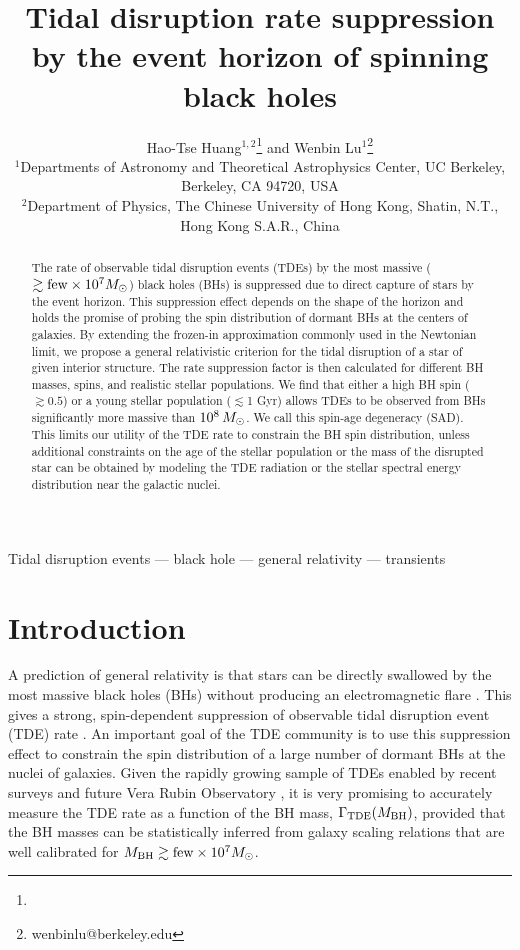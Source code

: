 \documentclass[useAMS,usenatbib]{mn2e}
\title[TDEs by spinning BHs]{Tidal disruption rate suppression by the event horizon of spinning black holes}
\author[Huang \& Lu]
  {Hao-Tse Huang$^{1,2}$\thanks{\myemail} and Wenbin Lu$^{1}$\thanks{wenbinlu@berkeley.edu}\\
    $^1$Departments of Astronomy and Theoretical Astrophysics Center, UC Berkeley, Berkeley, CA 94720, USA\\
    $^2$Department of Physics, The Chinese University of Hong Kong, Shatin, N.T., Hong Kong S.A.R., China\\
    }
\def\mr{\mathrm}
\def\msun{M_{\rm \odot}}
\def\mBH{M_{\rm BH}}
\begin{document}
\label{firstpage}
\maketitle

\begin{abstract}
The rate of observable tidal disruption events (TDEs) by the most massive ($\gtrsim\mr{few}\times 10^7\msun$) black holes (BHs) is suppressed due to direct capture of stars by the event horizon. This suppression effect depends on the shape of the horizon and holds the promise of probing the spin distribution of dormant BHs at the centers of galaxies. By extending the frozen-in approximation commonly used in the Newtonian limit, we propose a general relativistic criterion for the tidal disruption of a star of given interior structure. The rate suppression factor is then calculated for different BH masses, spins, and realistic stellar populations. We find that either a high BH spin ($\gtrsim 0.5$) or a young stellar population ($\lesssim$1 Gyr) allows TDEs to be observed from BHs significantly more massive than $10^8\,\msun$. We call this spin-age degeneracy (SAD). This limits our utility of the TDE rate to constrain the BH spin distribution, unless additional constraints on the age of the stellar population or the mass of the disrupted star can be obtained by modeling the TDE radiation or the stellar spectral energy distribution near the galactic nuclei.
\end{abstract}

\begin{keywords}
Tidal disruption events --- black hole --- general relativity --- transients
\end{keywords}

\section{Introduction}

A prediction of general relativity is that stars can be directly swallowed by the most massive black holes (BHs) without producing an electromagnetic flare \citep{Young1977, Rees1988, Kesden2012, lu17_event_horizon, vanvelzen18_TDE_rate_suppression}. This gives a strong, spin-dependent suppression of observable tidal disruption event (TDE) rate \citep{Kesden2012, Coughlin2022a}. An important goal of the TDE community is to use this suppression effect to constrain the spin distribution of a large number of dormant BHs at the nuclei of galaxies. Given the rapidly growing sample of TDEs enabled by recent surveys \citep{holoien19_TESS_TDE, hung20_AT2018hyz, vanvelzen21_ZTF_TDEs, sazonov21_eROSITA_TDEs, hammerstein22_ZTF_TDEs} and future Vera Rubin Observatory \citep{ivezic19_LSST}, it is very promising to accurately measure the TDE rate as a function of the BH mass, $\Gamma_{\rm TDE}(\mBH)$, provided that the BH masses can be statistically inferred from galaxy scaling relations \citep[e.g., the $\mBH$-$\sigma$ relation, see][]{kormendy13_scaling_relations} that are well calibrated for $\mBH\gtrsim \mbox{few}\times10^7\msun$. 
\end{document}
